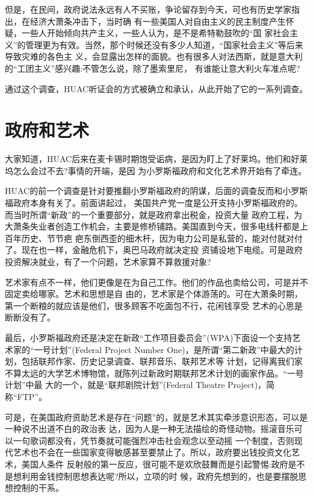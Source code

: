 \documentclass[10pt]{article}
\begin{document}
{但是，在民间，政府说法永远有人不买账，争论留存到今天，可也有历史学家指出，在经济大萧条冲击下，当时确
有一些美国人对自由主义的民主制度产生怀疑，一些人开始倾向共产主义，一些人认为，是不是希特勒鼓吹的``国
家社会主义''的管理更为有效。当然，那个时候还没有多少人知道，``国家社会主义''等后来导致灾难的各色主
义，会显露出怎样的面貌。也有很多人对法西斯，就是意大利的``工团主义''感兴趣:不管怎么说，除了墨索里尼，
有谁能让意大利火车准点呢?

通过这个调查，HUAC听证会的方式被确立和承认，从此开始了它的一系列调查。

\pagebreak
\section{政府和艺术}

大家知道，HUAC后来在麦卡锡时期饱受诟病，是因为盯上了好莱坞。他们和好莱坞怎么会过不去?事情的开端，是因
为小罗斯福政府和文化艺术界开始有了牵连。

HUAC的前一个调查是针对要推翻小罗斯福政府的阴谋，后面的调查反而和小罗斯福政府本身有关了。前面讲起过，
美国共产党一度是公开支持小罗斯福政府的。而当时所谓``新政''的一个重要部分，就是政府拿出税金，投资大量
政府工程，为大萧条失业者创造工作机会，主要是修桥铺路。美国直到今天，很多电线杆都是上百年历史、节节疤
疤东倒西歪的细木杆，因为电力公司是私营的，能对付就对付了。现在也一样，金融危机下，奥巴马政府就决定投
资铺设地下电缆。可是政府投资解决就业，有了一个问题，艺术家算不算救援对象?

艺术家有点不一样，他们更像是在为自己工作。他们的作品也卖给公司，可是并不固定卖给哪家。艺术和思想是自
由的，艺术家是个体游荡的。可在大萧条时期，第一个断粮的就应该是他们，很多顾客不吃面包不行，花闲钱享受
艺术的心思是断断没有了。

最后，小罗斯福政府还是决定在新政``工作项目委员会''(WPA)下面设一个支持艺术家的``一号计划''(Federal
Project Number One)，是所谓``第二新政''中最大的计划，包括联邦作家、历史记录调查、联邦音乐、联邦艺术等
计划，记得离我们家不算太远的大学艺术博物馆，就陈列过新政时期联邦艺术计划的画家作品。``一号计划''中最
大的一个，就是``联邦剧院计划''(Federal Theatre Project)，简称``FTP''。

可是，在美国政府资助艺术是存在``问题''的，就是艺术其实牵涉意识形态，可以是一种说不出道不白的政治表
达，因为人是一种无法描绘的奇怪动物。摇滚音乐可以一句歌词都没有，凭节奏就可能强烈冲击社会观念以至动摇
一个制度，否则现代艺术也不会在一些国家变得敏感甚至要禁止了。所以，政府要出钱投资文化艺术，美国人条件
反射般的第一反应，很可能不是欢欣鼓舞而是引起警惕:政府是不是想利用金钱控制思想表达呢?所以，立项的时
候，政府先想到的，也是要摆脱思想控制的干系。

}
\end{document}
